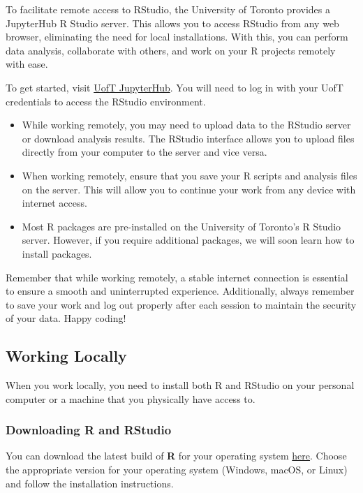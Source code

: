 \documentclass[
]{book}
\providecommand{\tightlist}{%
  \setlength{\itemsep}{0pt}\setlength{\parskip}{0pt}}
\begin{document}
To facilitate remote access to RStudio, the University of Toronto provides a JupyterHub R Studio server. This allows you to access RStudio from any web browser, eliminating the need for local installations. With this, you can perform data analysis, collaborate with others, and work on your R projects remotely with ease.

To get started, visit \href{https://r.datatools.utoronto.ca/}{UofT JupyterHub}. You will need to log in with your UofT credentials to access the RStudio environment.

\begin{itemize}
\tightlist
\item
  While working remotely, you may need to upload data to the RStudio server or download analysis results. The RStudio interface allows you to upload files directly from your computer to the server and vice versa.
\item
  When working remotely, ensure that you save your R scripts and analysis files on the server. This will allow you to continue your work from any device with internet access.
\item
  Most R packages are pre-installed on the University of Toronto's R Studio server. However, if you require additional packages, we will soon learn how to install packages.
\end{itemize}

Remember that while working remotely, a stable internet connection is essential to ensure a smooth and uninterrupted experience. Additionally, always remember to save your work and log out properly after each session to maintain the security of your data. Happy coding!

\hypertarget{working-locally}{%
\subsection{Working Locally}\label{working-locally}}

When you work locally, you need to install both R and RStudio on your personal computer or a machine that you physically have access to.

\hypertarget{downloading-r-and-rstudio}{%
\subsubsection{Downloading R and RStudio}\label{downloading-r-and-rstudio}}

You can download the latest build of \textbf{R} for your operating system \href{https://cloud.r-project.org/}{here}. Choose the appropriate version for your operating system (Windows, macOS, or Linux) and follow the installation instructions.
\end{document}
